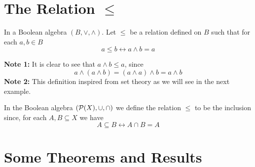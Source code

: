 \section{The Relation $\leq$}

\begin{mydef} 
    In a Boolean algebra \((B,\vee,\wedge)\). Let \(\leq\) be a relation defined on \(B\) such that for each \(a,b\in B\) 
    \[
    a\leq b \longleftrightarrow a\wedge b=a
    \]
\end{mydef}

\noindent
\textbf{Note 1: }It is clear to see that \(a\wedge b\leq a\), since
\[
a\wedge(a\wedge b)=(a\wedge a)\wedge b=a\wedge b
\]
\textbf{Note 2: }This definition inspired from set theory as we will see in the next example.
\begin{example}
    In the Boolean algebra \((\mathcal{P}(X),\cup,\cap)\) we define the relation \(\leq\) to be the inclusion since, for each \(A,B\subseteq X\) we have
    \[
    A\subseteq B\longleftrightarrow A\cap B=A
    \]
\end{example}

\section{Some Theorems and Results}

